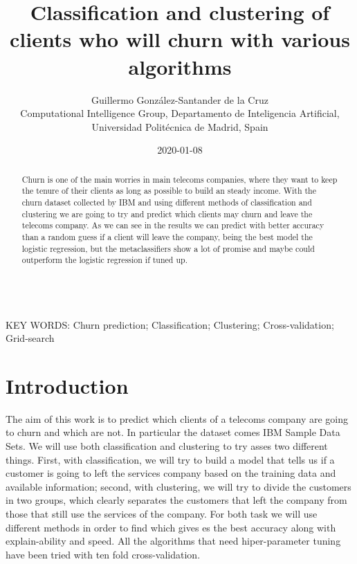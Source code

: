 \documentclass[a4paper,11pt]{article}
\begin{document}
\title{Classification and clustering of clients who will churn with various algorithms}

\author{{Guillermo González-Santander de la Cruz}\\
{\small Computational Intelligence Group, Departamento de Inteligencia Artificial, Universidad Politécnica de Madrid, Spain}}

\date{2020-01-08}
\maketitle



\begin{abstract}
Churn is one of the main worries in main telecoms companies, where they want to keep the tenure of their clients as long as possible to build an steady income. With the churn dataset collected by IBM and using different methods of classification and clustering we are going to try and predict which clients may churn and leave the telecoms company.
As we can see in the results we can predict with better accuracy than a random guess if a client will leave the company, being the best model the logistic regression, but the metaclassifiers show a lot of promise and maybe could outperform the logistic regression if tuned up.
\end{abstract}


\ \\
KEY WORDS: Churn prediction; Classification; Clustering; Cross-validation; Grid-search

\section{Introduction}

The aim of this work is to predict which clients of a telecoms company are going to churn and which are not. In particular the dataset comes IBM Sample Data Sets.
We will use both classification and clustering to try asses two different things. First, with classification, we will try to build a model that tells us if a customer is going to left the services company based on the training data and available information; second, with clustering, we will try to divide the customers in two groups, which clearly separates the customers that left the company from those that still use the services of the company.
For both task we will use different methods in order to find which gives es the best accuracy along with explain-ability and speed.
All the algorithms that need hiper-parameter tuning have been tried with ten fold cross-validation.
\end{document}
